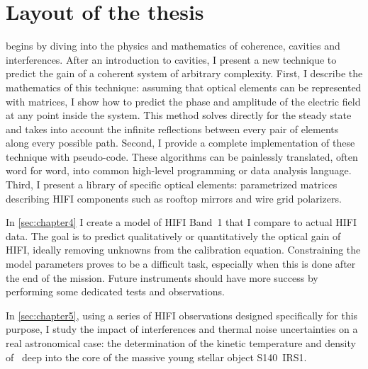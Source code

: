 \section{Layout of the thesis}
\label{sec:thesis_layout}

 begins by diving into the physics and mathematics of coherence, cavities and interferences.
After an introduction to cavities, I present a new technique to predict the gain of a coherent system of arbitrary complexity.
First, I describe the mathematics of this technique:
assuming that optical elements can be represented with matrices, I show how to predict the phase and amplitude of the electric field at any point inside the system.
This method solves directly for the steady state and takes into account the infinite reflections between every pair of elements along every possible path.
Second, I provide a complete implementation of these technique with pseudo-code.
These algorithms can be painlessly translated, often word for word, into common high-level programming or data analysis language.
Third, I present a library of specific optical elements: parametrized matrices describing HIFI components such as rooftop mirrors and wire grid polarizers.

In \cref{sec:chapter4} I create a model of HIFI Band~1 that I compare to actual HIFI data.
The goal is to predict qualitatively or quantitatively the optical gain of HIFI, ideally removing unknowns from the calibration equation.
Constraining the model parameters proves to be a difficult task, especially when this is done after the end of the mission.
Future instruments should have more success by performing some dedicated tests and observations.

In \cref{sec:chapter5}, using a series of HIFI observations designed specifically for this purpose, I study the impact of interferences and thermal noise uncertainties on a real astronomical case: the determination of the kinetic temperature and density of~ deep into the core of the massive young stellar object S140~IRS1.


